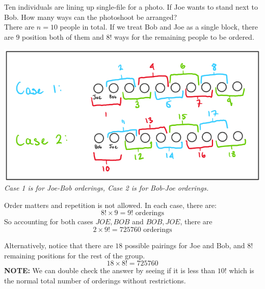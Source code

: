 \documentclass[12pt]{article}
\theoremstyle{definition}
\begin{document}
    \begin{example}
        Ten individuals are lining up single-file for a photo. If Joe wants to stand next to Bob.
        How many ways can the photoshoot be arranged? \\

        There are $n = 10$ people in total. If we treat Bob and Joe as a single block, there are $9$ position both of
        them and $8!$ ways for the remaining people to be ordered.\\
        \begin{center}
            \includegraphics[scale=0.66]{grouping_counting_problem.png}\\
            \textit{Case 1 is for Joe-Bob orderings, Case 2 is for Bob-Joe orderings.}
        \end{center}
        \vspace{25px}

        Order matters and repetition is not allowed. In each case, there are:
        \begin{equation*}
            8! \times 9 = 9! \text{ orderings}
        \end{equation*}
        So accounting for both cases $JOE,BOB$ and $BOB,JOE$, there are
        \begin{equation*}
            2 \times 9! = 725760 \text{ orderings}
        \end{equation*}

        Alternatively, notice that there are $18$ possible pairings for Joe and Bob, and $8!$ remaining positions for the
        rest of the group.
        \begin{equation*}
            18 \times 8! = 725760
        \end{equation*}
        \textbf{NOTE:} We can double check the answer by seeing if it is less than $10!$ which is the normal total number
        of orderings without restrictions.
    \end{example}
    \vspace{25px}
\end{document}

